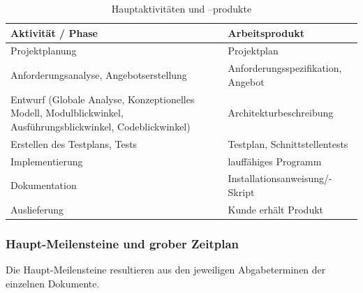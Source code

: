 \documentclass[fontsize=12pt,paper=a4,twoside]{scrartcl}
\begin{document}
\begin{table}[htbp]
\caption{Hauptaktivitäten und --produkte}
\centering
\begin{tabular}{p{7cm}|p{7cm}}
\hline \textbf{Aktivität / Phase} & \textbf{Arbeitsprodukt} \\ \hline
\hline Projektplanung & Projektplan\\
\hline Anforderungsanalyse, Angebotserstellung & Anforderungsspezifikation, Angebot\\
\hline Entwurf (Globale Analyse, Konzeptionelles Modell, Modulblickwinkel, Ausführungsblickwinkel, Codeblickwinkel) & Architekturbeschreibung\\
\hline Erstellen des Testplans, Tests & Testplan, Schnittstellentests\\
\hline Implementierung & lauffähiges Programm\\
\hline Dokumentation & Installationsanweisung/-Skript\\
\hline Auslieferung & Kunde erhält Produkt\\
\hline 
\end{tabular}
\end{table}

\newpage

\subsubsection{Haupt-Meilensteine und grober Zeitplan}\label{meilensteine}

Die Haupt-Meilensteine resultieren aus den jeweiligen Abgabeterminen der einzelnen Dokumente.
\end{document}
